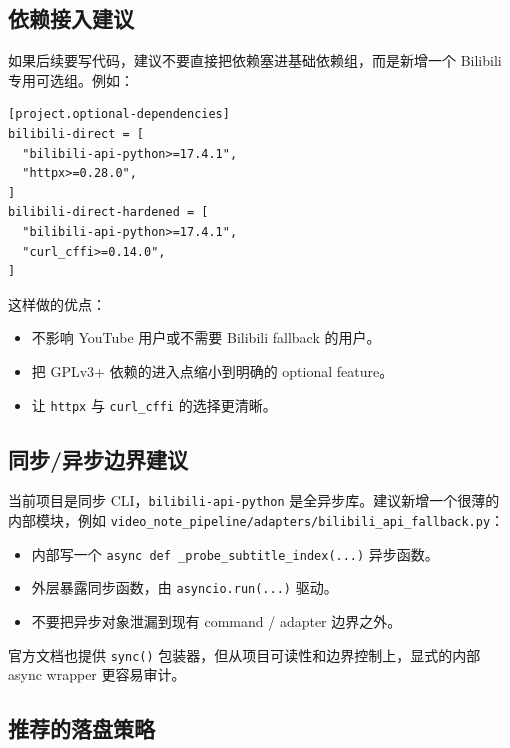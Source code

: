 \documentclass[a4paper]{article}
\begin{document}
\subsection{依赖接入建议}

如果后续要写代码，建议不要直接把依赖塞进基础依赖组，而是新增一个 Bilibili 专用可选组。例如：

\begin{lstlisting}[caption={建议的 pyproject optional dependency 方向}]
[project.optional-dependencies]
bilibili-direct = [
  "bilibili-api-python>=17.4.1",
  "httpx>=0.28.0",
]
bilibili-direct-hardened = [
  "bilibili-api-python>=17.4.1",
  "curl_cffi>=0.14.0",
]
\end{lstlisting}

这样做的优点：
\begin{itemize}
\item 不影响 YouTube 用户或不需要 Bilibili fallback 的用户。
\item 把 GPLv3+ 依赖的进入点缩小到明确的 optional feature。
\item 让 \texttt{httpx} 与 \texttt{curl\_cffi} 的选择更清晰。
\end{itemize}

\subsection{同步/异步边界建议}

当前项目是同步 CLI，\texttt{bilibili-api-python} 是全异步库。建议新增一个很薄的内部模块，例如 \texttt{video\_note\_pipeline/adapters/bilibili\_api\_fallback.py}：
\begin{itemize}
\item 内部写一个 \texttt{async def \_probe\_subtitle\_index(...)} 异步函数。
\item 外层暴露同步函数，由 \texttt{asyncio.run(...)} 驱动。
\item 不要把异步对象泄漏到现有 command / adapter 边界之外。
\end{itemize}

官方文档也提供 \texttt{sync()} 包装器，但从项目可读性和边界控制上，显式的内部 async wrapper 更容易审计。

\subsection{推荐的落盘策略}
\end{document}
